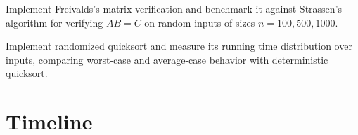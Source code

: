 \begin{exercise}[Computational]
Implement Freivalds's matrix verification and benchmark it against Strassen's algorithm for verifying $AB = C$ on random inputs of sizes $n = 100, 500, 1000$.
\end{exercise}

\begin{exercise}[Computational]
Implement randomized quicksort and measure its running time distribution over inputs, comparing worst-case and average-case behavior with deterministic quicksort.
\end{exercise}

\section{Timeline}
\label{sec:randomized:timeline}

